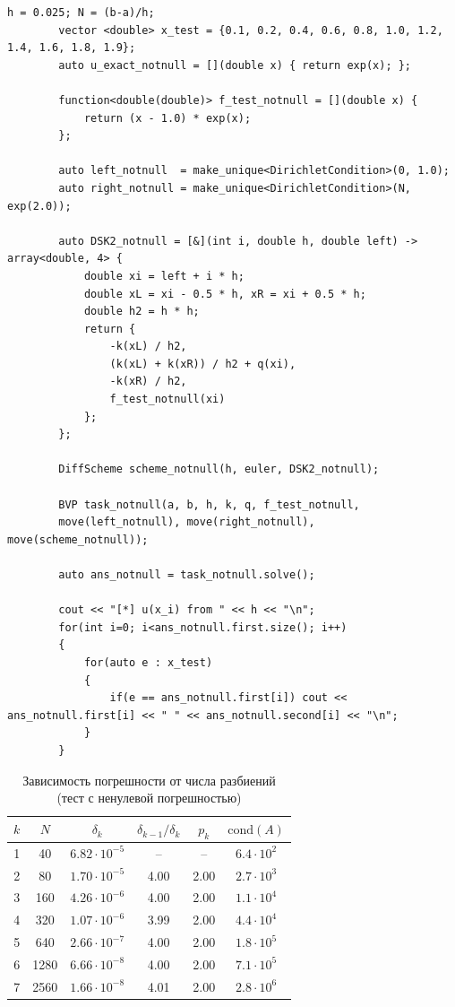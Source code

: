 \documentclass[a4paper,12pt]{article}
\begin{document}
	\begin{lstlisting}[caption={Тест с ненулевой погрешностью}, label={lst:main}]
		h = 0.025; N = (b-a)/h;
		vector <double> x_test = {0.1, 0.2, 0.4, 0.6, 0.8, 1.0, 1.2, 1.4, 1.6, 1.8, 1.9};
		auto u_exact_notnull = [](double x) { return exp(x); };
		
		function<double(double)> f_test_notnull = [](double x) {
			return (x - 1.0) * exp(x);
		};
		
		auto left_notnull  = make_unique<DirichletCondition>(0, 1.0);
		auto right_notnull = make_unique<DirichletCondition>(N, exp(2.0));
		
		auto DSK2_notnull = [&](int i, double h, double left) -> array<double, 4> {
			double xi = left + i * h;
			double xL = xi - 0.5 * h, xR = xi + 0.5 * h;
			double h2 = h * h;
			return {
				-k(xL) / h2,
				(k(xL) + k(xR)) / h2 + q(xi),
				-k(xR) / h2,
				f_test_notnull(xi)
			};
		};
		
		DiffScheme scheme_notnull(h, euler, DSK2_notnull);
		
		BVP task_notnull(a, b, h, k, q, f_test_notnull,
		move(left_notnull), move(right_notnull), move(scheme_notnull));
		
		auto ans_notnull = task_notnull.solve();
		
		cout << "[*] u(x_i) from " << h << "\n";
		for(int i=0; i<ans_notnull.first.size(); i++)
		{
			for(auto e : x_test)
			{
				if(e == ans_notnull.first[i]) cout << ans_notnull.first[i] << " " << ans_notnull.second[i] << "\n";
			}
		}
	\end{lstlisting}
	
	\begin{table}[H]
		\centering
		\caption{Зависимость погрешности от числа разбиений (тест с ненулевой погрешностью)}
		\label{tab:nonzero_error}
		\begin{tabular}{|c|c|c|c|c|c|}
			\hline
			$k$ & $N$ & $\delta_k$ & $\delta_{k-1} / \delta_k$ & $p_k$ & $\mathrm{cond}(A)$ \\
			\hline
			1 & 40   & $6.82 \cdot 10^{-5}$ & --   & --   & $6.4 \cdot 10^2$ \\
			2 & 80   & $1.70 \cdot 10^{-5}$ & 4.00 & 2.00 & $2.7 \cdot 10^3$ \\
			3 & 160  & $4.26 \cdot 10^{-6}$ & 4.00 & 2.00 & $1.1 \cdot 10^4$ \\
			4 & 320  & $1.07 \cdot 10^{-6}$ & 3.99 & 2.00 & $4.4 \cdot 10^4$ \\
			5 & 640  & $2.66 \cdot 10^{-7}$ & 4.00 & 2.00 & $1.8 \cdot 10^5$ \\
			6 & 1280 & $6.66 \cdot 10^{-8}$ & 4.00 & 2.00 & $7.1 \cdot 10^5$ \\
			7 & 2560 & $1.66 \cdot 10^{-8}$ & 4.01 & 2.00 & $2.8 \cdot 10^6$ \\
			\hline
		\end{tabular}
	\end{table}
	
\end{document}
